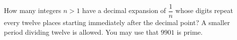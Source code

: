 How many integers $n>1$ have a decimal expansion of $\dfrac{1}{n}$ whose digits repeat every twelve places starting immediately after the decimal point? A smaller period dividing twelve is allowed. You may use that $9901$ is prime.
